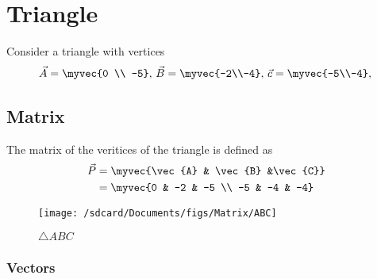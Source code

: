 \documentclass[11pt]{book}
\begin{document}
\frontmatter
\tableofcontents
\setcounter{page}{0}
\mainmatter
\chapter{Triangle}
Consider a triangle with vertices
\begin{align}
\label{eq:tri-pts}
\vec{A}=\myvec{0 \\ -5},\,
\vec{B}=\myvec{-2\\-4},\,
	\vec{c}=\myvec{-5\\-4},\,
\end{align}

\section{Matrix}

The matrix of the veritices of the triangle is defined as
		\begin{align}
			\vec{P} &= \myvec{\vec{A} & \vec{B} &\vec{C}} \\
            &=\myvec{0 & -2 & -5 \\ -5 & -4 & -4}
		\end{align}

		\begin{figure}[H]
\texttt{[image: /sdcard/Documents/figs/Matrix/ABC]}
\caption{ $\triangle ABC$}
\label{fig:fig1}
\end{figure}

\subsection{Vectors}
\end{document}
